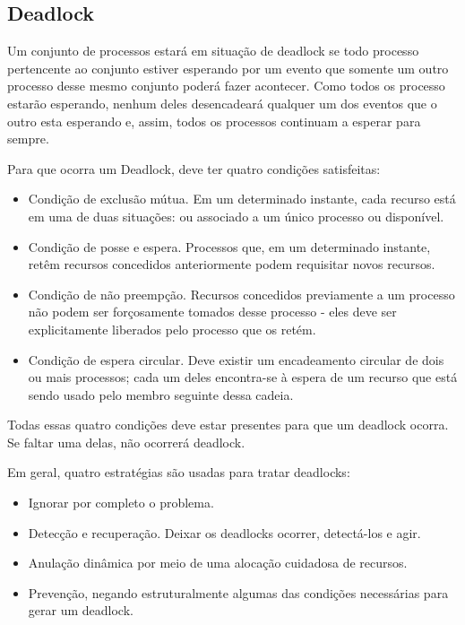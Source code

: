 \subsection{Deadlock}

Um conjunto de processos estará em situação de deadlock se todo processo pertencente ao conjunto 
estiver esperando por um evento que somente um outro processo desse mesmo conjunto poderá fazer 
acontecer. Como todos os processo estarão esperando, nenhum deles desencadeará qualquer um dos 
eventos que o outro esta esperando e, assim, todos os processos continuam a esperar para sempre.

Para que ocorra um Deadlock, deve ter quatro condições satisfeitas:

\begin{itemize}
\item Condição de exclusão mútua. Em um determinado instante, cada recurso está em uma de duas situações:
ou associado a um único processo ou disponível.
\item Condição de posse e espera. Processos que, em um determinado instante, retêm recursos concedidos
anteriormente podem requisitar novos recursos.
\item Condição de não preempção. Recursos concedidos previamente a um processo não podem ser 
forçosamente tomados desse processo - eles deve ser explicitamente liberados pelo processo que os retém.
\item Condição de espera circular. Deve existir um encadeamento circular de dois ou mais processos; cada um
deles encontra-se à espera de um recurso que está sendo usado pelo membro seguinte dessa cadeia.
\end{itemize}

Todas essas quatro condições deve estar presentes para que um deadlock ocorra. Se faltar
uma delas, não ocorrerá deadlock.

Em geral, quatro estratégias são usadas para tratar deadlocks:

\begin{itemize}
\item Ignorar por completo o problema.
\item Detecção e recuperação. Deixar os deadlocks ocorrer, detectá-los e agir.
\item Anulação dinâmica por meio de uma alocação cuidadosa de recursos.
\item Prevenção, negando estruturalmente algumas das condições necessárias para gerar um deadlock.
\end{itemize}

